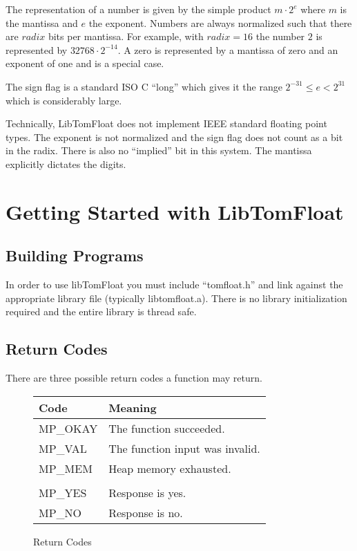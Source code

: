 \documentclass[b5paper]{book}
\begin{document}
The representation of a number is given by the simple product $m \cdot 2^e$ where $m$ is the mantissa and $e$ the exponent.  Numbers are
always normalized such that there are $radix$ bits per mantissa.  For example, with $radix = 16$ the number $2$ is represented by 
$32768 \cdot 2^{-14}$.  A zero is represented by a mantissa of zero and an exponent of one and is a special case.

The sign flag is a standard ISO C ``long'' which gives it the range $2^{-31} \le e < 2^{31}$ which is considerably large.  

Technically, LibTomFloat does not implement IEEE standard floating point types.  The exponent is not normalized and the sign flag does not 
count as a bit in the radix.  There is also no ``implied'' bit in this system.  The mantissa explicitly dictates the digits.

\chapter{Getting Started with LibTomFloat}
\section{Building Programs}
In order to use libTomFloat you must include ``tomfloat.h'' and link against the appropriate library file (typically 
libtomfloat.a).  There is no library initialization required and the entire library is thread safe.

\section{Return Codes}
There are three possible return codes a function may return.

\begin{figure}[here!]
\begin{center}
\begin{small}
\begin{tabular}{|l|l|}
\hline \textbf{Code} & \textbf{Meaning} \\
\hline MP\_OKAY & The function succeeded. \\
\hline MP\_VAL  & The function input was invalid. \\
\hline MP\_MEM  & Heap memory exhausted. \\
\hline &\\
\hline MP\_YES  & Response is yes. \\
\hline MP\_NO   & Response is no. \\
\hline
\end{tabular}
\end{small}
\end{center}
\caption{Return Codes}
\end{figure}
\end{document}
